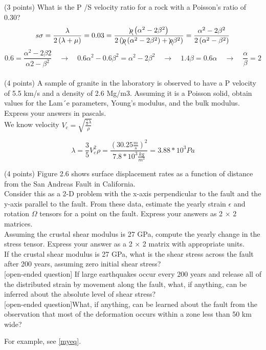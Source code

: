 \documentclass{article}
\begin{document}
(3 points) What is the P /S velocity ratio for a rock with a Poisson’s ratio of 0.30?\\
\[s
\sigma = \frac{ \lambda } { 2 \left( \lambda + \mu \right) } = 0.03 = \frac { \bcancel{\rho} \left( \alpha^{2} - 2\beta^{2} \right)} { 2 \left( \bcancel{\rho} \left(  \alpha^{2} - 2\beta^{2} \right) + \bcancel{\rho}\beta^{2} \right)} = \frac{ \alpha^{2} - 2\beta^{2} } { 2 \left( \alpha^{2} - \beta^{2} \right) }
\]
\[
0.6 = \frac{ \alpha^{2} - 2\beta{2} } {\alpha{2} - \beta^{2} } \quad \rightarrow \quad 0.6\alpha^{2} - 0.6\beta^{2} = \alpha^{2} - 2\beta^{2} \quad \rightarrow \quad 1.4\beta = 0.6\alpha \quad \rightarrow \quad \frac{ \alpha } { \beta } = 2
\]\\
(4 points) A sample of granite in the laboratory is observed to have a P velocity of 5.5 km/s and a density of 2.6 Mg/m3. Assuming it is a Poisson solid, obtain values for the Lam´e parameters, Young’s modulus, and the bulk modulus. Express your answers in pascals.\\

We know velocity $V_c = \sqrt{ \frac{ \frac{5}{3} \lambda }{\rho} } $

\[
\lambda = \frac{3}{5} V_c^{2} \rho = \frac{ \left( 30.25 \frac{m}{s} \right)^{2}}{7.8 * 10^{3} \frac{kg}{m^{3}} } = 3.88 * 10^{3} Pa
\] 


(4 points) Figure 2.6 shows surface displacement rates as a function of distance from the San Andreas Fault in California.\\
 

Consider this as a 2-D problem with the x-axis perpendicular to the fault and the y-axis parallel to the fault. From these data, estimate the yearly strain $\epsilon$ and rotation $\Omega$ tensors for a point on the fault. Express your answers as 2 × 2 matrices.\\

Assuming the crustal shear modulus is 27 GPa, compute the yearly change in the stress tensor. Express your answer as a 2 × 2 matrix with appropriate units.\\

If the crustal shear modulus is 27 GPa, what is the shear stress across the fault after 200 years, assuming zero initial shear stress?\\

[open-ended question] If large earthquakes occur every 200 years and release all of the distributed strain by movement along the fault, what, if anything, can be inferred about the absolute level of shear stress?\\

[open-ended question]What, if anything, can be learned about the fault from the observation that most of the deformation occurs within a zone less than 50 km wide? 





For example, see \eqref{myeq}.
\end{document}
